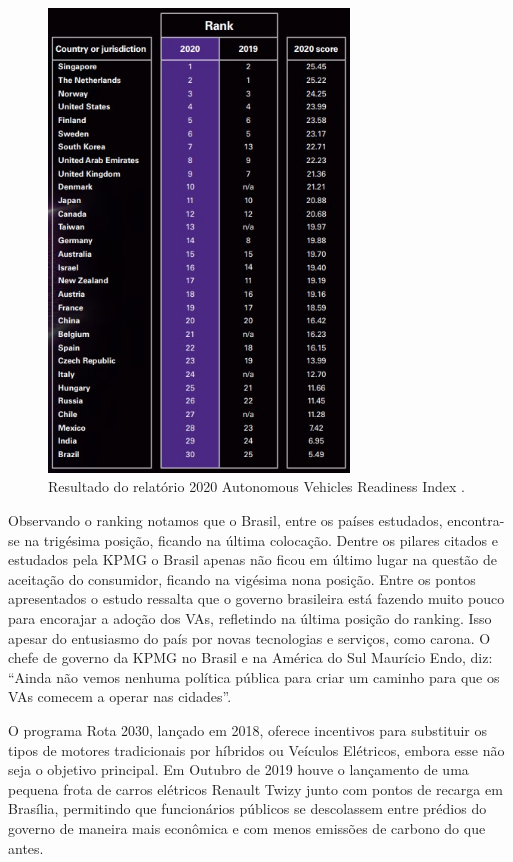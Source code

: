 \begin{figure}[H]
\centering
\includegraphics[width=8cm]{Figures/rank.jpg}
\caption{Resultado do relatório 2020 Autonomous Vehicles Readiness Index \cite{KPMG}.}
\label{KPMG}
\end{figure}

Observando o ranking notamos que o Brasil, entre os países estudados, encontra-se na trigésima posição, ficando na última colocação. Dentre os pilares citados e estudados pela KPMG o Brasil apenas não ficou em último lugar na questão de aceitação do consumidor, ficando na vigésima nona posição.
Entre os pontos apresentados o estudo ressalta que o governo brasileira está fazendo muito pouco para encorajar a adoção dos VAs, refletindo na última posição do ranking. Isso apesar do entusiasmo do país por novas tecnologias e serviços, como carona. O chefe de governo da KPMG no Brasil e na América do Sul Maurício Endo, diz: “Ainda não vemos nenhuma política pública para criar um caminho para que os VAs comecem a operar nas cidades”.

O programa Rota 2030, lançado em 2018, oferece incentivos para substituir os tipos de motores tradicionais por híbridos ou Veículos Elétricos, embora esse não seja o objetivo principal. Em Outubro de 2019 houve o lançamento de uma pequena frota de carros elétricos Renault Twizy junto com pontos de recarga em Brasília, permitindo que funcionários públicos se descolassem entre prédios do governo de maneira mais econômica e com menos emissões de carbono do que antes.

